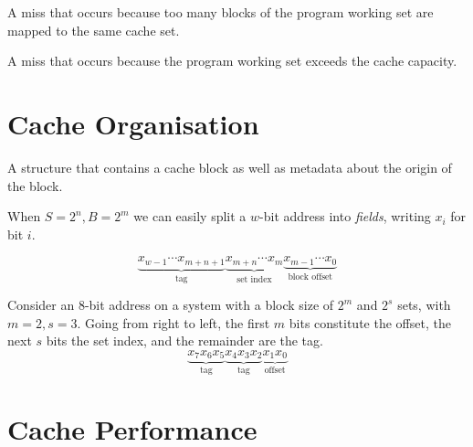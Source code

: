 \begin{definition}
  A miss that occurs because too many blocks of the program working
  set are mapped to the same cache set.
\end{definition}

\begin{definition}
  A miss that occurs because the program working set exceeds the cache
  capacity.
\end{definition}

\section{Cache Organisation}
\label{sec:cache-organisation}

\begin{definition}
  A structure that contains a cache block as well as metadata about
  the origin of the block.
\end{definition}

When $S=2^{n}, B=2^{m}$ we can easily split a $w$-bit address into
\emph{fields}, writing $x_{i}$ for bit $i$.

  \[
    \underbrace{x_{w-1}\cdots{}x_{m+n+1}}_{\text{tag}}
    \underbrace{x_{m+n}\cdots{}x_{m}}_{\text{set index}}
    \underbrace{x_{m-1}\cdots{}x_{0}}_{\text{block offset}}
  \]

  \begin{example}
    Consider an $8$-bit address on a system with a block size of
    $2^{m}$ and $2^{s}$ sets, with $m=2,s=3$.  Going from right to
    left, the first $m$ bits constitute the offset, the next $s$ bits
    the set index, and the remainder are the tag.
    \[
      \underbrace{x_{7}x_{6}x_{5}}_{\text{tag}}
      \underbrace{x_{4}x_{3}x_{2}}_{\text{tag}}
      \underbrace{x_{1}x_{0}}_{\text{offset}}
    \]
  \end{example}

\section{Cache Performance}

